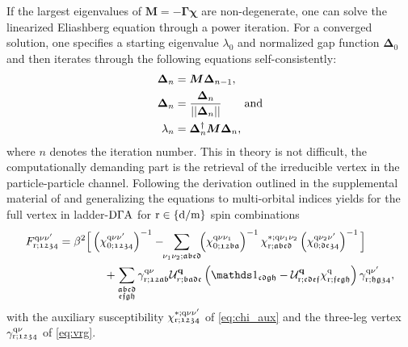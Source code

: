 \documentclass[../../main.tex]{subfiles}
\begin{document}
If the largest eigenvalues of $\bm M = -\bm\Gamma\bm\chi$ are non-degenerate, one can solve the linearized Eliashberg equation through a power iteration. For a converged solution, one specifies a starting eigenvalue $\lambda_0$ and normalized gap function $\bm\Delta_0$ and then iterates through the following equations self-consistently:
\begin{subequations}
\begin{align}
	\bm\Delta_{n} &= \bm M\bm\Delta_{n-1},\\
	\bm\Delta_{n} &= \frac{\bm\Delta_{n}}{||\bm\Delta_{n}||}\qquad\text{and}\\
	\lambda_{n} &= \bm\Delta_{n}^{\dagger}\bm M\bm\Delta_{n},
\end{align}
\end{subequations}
where $n$ denotes the iteration number. This in theory is not difficult, the computationally demanding part is the retrieval of the irreducible vertex in the particle-particle channel. Following the derivation outlined in the supplemental material of \cite{motoharu why tc is so low} and generalizing the equations to multi-orbital indices yields for the full vertex in ladder-$\text{D}\Gamma\text{A}$ for $\text{r}\in\{\text{d}/\text{m}\}$ spin combinations
\begin{align}
\begin{split}
	F^{\q\nu\nu'}_{\r;\mathfrak{1234}}&=\beta^2\Big [\left (\chi_{0;\mathfrak{1234}}^{\q\nu\nu'}\right )^{-1}-\!\!\sum_{\nu_1\nu_2;\mathfrak{abcd}}\!\!\left (\chi_{0;\mathfrak{12ba}}^{\q\nu\nu_1}\right )^{-1} \chi_{\r;\mathfrak{abcd}}^{*;\q\nu_1\nu_2} \left (\chi_{0;\mathfrak{dc34}}^{\q\nu_2\nu'}\right )^{-1}\Big ]\\
	&\qquad\qquad + \sum_{\substack{\mathfrak{abcd}\\\mathfrak{efgh}}} \gamma^{\q\nu}_{\r;\mathfrak{12ab}} \mathcal{U}^{\vv{q}}_{r;\mathfrak{badc}}\left (\unity_{\mathfrak{cdgh}}-\mathcal{U}^{\vv{q}}_{\r;\mathfrak{cdef}}\chi^{\q}_{\r;\mathfrak{fegh}}\right )\gamma^{\q\nu'}_{\r;\mathfrak{hg34}}, 
\end{split}
\end{align}
with the auxiliary susceptibility $\chi_{\text{r};\mathfrak{1234}}^{*;\text{q}\nu\nu'}$ of \eqref{eq:chi_aux} and the three-leg vertex $\gamma^{\text{q}\nu}_{\text{r};\mathfrak{1234}}$ of \eqref{eq:vrg}.
\end{document}
